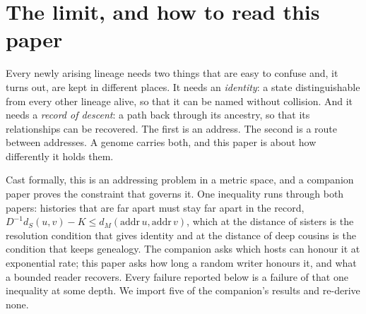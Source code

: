 \documentclass[11pt]{article}
\begin{document}
\section{The limit, and how to read this paper}

Every newly arising lineage needs two things that are easy to confuse and, it turns out, are kept in different places. It needs an \emph{identity}: a state distinguishable from every other lineage alive, so that it can be named without collision. And it needs a \emph{record of descent}: a path back through its ancestry, so that its relationships can be recovered. The first is an address. The second is a route between addresses. A genome carries both, and this paper is about how differently it holds them.

Cast formally, this is an addressing problem in a metric space, and a companion paper proves the constraint that governs it. One inequality runs through both papers: histories that are far apart must stay far apart in the record, $D^{-1}d_S(u,v)-K\le d_M(\mathrm{addr}\,u,\mathrm{addr}\,v)$, which at the distance of sisters is the resolution condition that gives identity and at the distance of deep cousins is the condition that keeps genealogy. The companion asks which hosts can honour it at exponential rate; this paper asks how long a random writer honours it, and what a bounded reader recovers. Every failure reported below is a failure of that one inequality at some depth. We import five of the companion's results and re-derive none.
\end{document}
